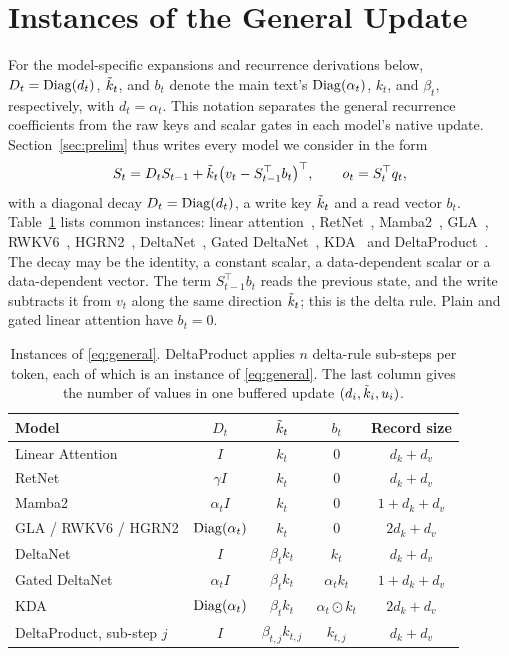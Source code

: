 \section{Instances of the General Update}
\label{app:instances}

For the model-specific expansions and recurrence derivations below, $D_t=\operatorname{Diag}(d_t)$, $\tilde{k}_t$, and $b_t$ denote the main text's $\operatorname{Diag}(\alpha_t)$, $k_t$, and $\beta_t$, respectively, with $d_t=\alpha_t$.
This notation separates the general recurrence coefficients from the raw keys and scalar gates in each model's native update.
Section~\ref{sec:prelim} thus writes every model we consider in the form
\begin{equation*}
  S_t = D_t S_{t-1} + \tilde{k}_t\bigl(v_t - S_{t-1}^{\top} b_t\bigr)^{\top},
  \qquad
  o_t = S_t^{\top} q_t,
\end{equation*}
with a diagonal decay $D_t=\operatorname{Diag}(d_t)$, a write key $\tilde{k}_t$ and a read vector $b_t$.
Table~\ref{tab:instances} lists common instances: linear attention~\citep{katharopoulos2020transformers}, RetNet~\citep{sun2023retentive}, Mamba2~\citep{dao2024transformers}, GLA~\citep{yang2023gated}, RWKV6~\citep{peng2024eagle}, HGRN2~\citep{qin2024hgrn2}, DeltaNet~\citep{yang2024parallelizing}, Gated DeltaNet~\citep{yang2025gated}, KDA~\citep{team2025kimi} and DeltaProduct~\citep{siems2025deltaproduct}.
The decay may be the identity, a constant scalar, a data-dependent scalar or a data-dependent vector.
The term $S_{t-1}^{\top}b_t$ reads the previous state, and the write subtracts it from $v_t$ along the same direction $\tilde{k}_t$; this is the delta rule.
Plain and gated linear attention have $b_t=0$.

\begin{table}[h]
  \centering
  \caption{Instances of \eqref{eq:general}. DeltaProduct applies $n$ delta-rule sub-steps per token, each of which is an instance of \eqref{eq:general}. The last column gives the number of values in one buffered update $(d_i,\tilde{k}_i,u_i)$.}
  \label{tab:instances}
  \small
  \begin{tabular}{@{}lcccc@{}}
    \toprule
    Model & $D_t$ & $\tilde{k}_t$ & $b_t$ & Record size \\
    \midrule
    Linear Attention & $I$ & $k_t$ & $0$ & $d_k+d_v$ \\
    RetNet & $\gamma I$ & $k_t$ & $0$ & $d_k+d_v$ \\
    Mamba2 & $\alpha_t I$ & $k_t$ & $0$ & $1+d_k+d_v$ \\
    GLA / RWKV6 / HGRN2 & $\operatorname{Diag}(\alpha_t)$ & $k_t$ & $0$ & $2d_k+d_v$ \\
    DeltaNet & $I$ & $\beta_t k_t$ & $k_t$ & $d_k+d_v$ \\
    Gated DeltaNet & $\alpha_t I$ & $\beta_t k_t$ & $\alpha_t k_t$ & $1+d_k+d_v$ \\
    KDA & $\operatorname{Diag}(\alpha_t)$ & $\beta_t k_t$ & $\alpha_t\odot k_t$ & $2d_k+d_v$ \\
    DeltaProduct, sub-step $j$ & $I$ & $\beta_{t,j}k_{t,j}$ & $k_{t,j}$ & $d_k+d_v$ \\
    \bottomrule
  \end{tabular}
\end{table}


